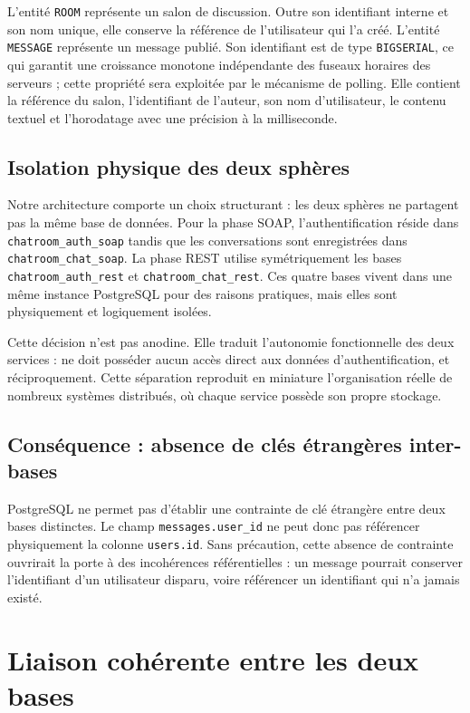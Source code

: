 L'entité \texttt{ROOM} représente un salon de discussion. Outre son identifiant interne et son nom unique, elle conserve la référence de l'utilisateur qui l'a créé. L'entité \texttt{MESSAGE} représente un message publié. Son identifiant est de type \texttt{BIGSERIAL}, ce qui garantit une croissance monotone indépendante des fuseaux horaires des serveurs ; cette propriété sera exploitée par le mécanisme de polling. Elle contient la référence du salon, l'identifiant de l'auteur, son nom d'utilisateur, le contenu textuel et l'horodatage avec une précision à la milliseconde.

\subsection{Isolation physique des deux sphères}

Notre architecture comporte un choix structurant : les deux sphères ne partagent pas la même base de données. Pour la phase SOAP, l'authentification réside dans \texttt{chatroom\_auth\_soap} tandis que les conversations sont enregistrées dans \texttt{chatroom\_chat\_soap}. La phase REST utilise symétriquement les bases \texttt{chatroom\_auth\_rest} et \texttt{chatroom\_chat\_rest}. Ces quatre bases vivent dans une même instance PostgreSQL pour des raisons pratiques, mais elles sont physiquement et logiquement isolées.

Cette décision n'est pas anodine. Elle traduit l'autonomie fonctionnelle des deux services :  ne doit posséder aucun accès direct aux données d'authentification, et réciproquement. Cette séparation reproduit en miniature l'organisation réelle de nombreux systèmes distribués, où chaque service possède son propre stockage.

\subsection{Conséquence : absence de clés étrangères inter-bases}

PostgreSQL ne permet pas d'établir une contrainte de clé étrangère entre deux bases distinctes. Le champ \texttt{messages.user\_id} ne peut donc pas référencer physiquement la colonne \texttt{users.id}. Sans précaution, cette absence de contrainte ouvrirait la porte à des incohérences référentielles : un message pourrait conserver l'identifiant d'un utilisateur disparu, voire référencer un identifiant qui n'a jamais existé.

\section{Liaison cohérente entre les deux bases}

